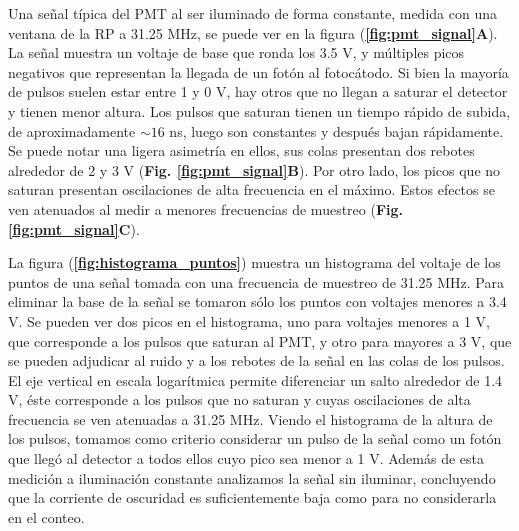 Una señal típica del PMT al ser iluminado de forma constante, medida con una ventana de la RP a 31.25 MHz,  se puede ver en la figura (\textbf{\ref{fig:pmt_signal}A}).
La señal muestra un voltaje de base que ronda los 3.5 V, y múltiples picos negativos que representan la llegada de un fotón al fotocátodo.
Si bien la mayoría de pulsos suelen estar entre 1 y 0 V, hay otros que no llegan a saturar el detector y tienen menor altura.
Los pulsos que saturan tienen un tiempo rápido de subida, de aproximadamente $\sim 16$ ns, luego son constantes y después bajan rápidamente.  
Se puede notar una ligera asimetría en ellos, sus colas presentan dos rebotes alrededor de 2 y 3 V (\textbf{Fig. \ref{fig:pmt_signal}B}).
Por otro lado, los picos que no saturan presentan oscilaciones de alta frecuencia en el máximo.
Estos efectos se ven atenuados al medir a menores frecuencias de muestreo (\textbf{Fig. \ref{fig:pmt_signal}C}). 

La figura (\textbf{\ref{fig:histograma_puntos}}) muestra un histograma del voltaje de los puntos de una señal tomada con una frecuencia de muestreo de 31.25 MHz.
Para eliminar la base de la señal se tomaron sólo los puntos con voltajes menores a 3.4 V.
Se pueden ver dos picos en el histograma, uno para voltajes menores a 1 V, que corresponde a los pulsos que saturan al PMT, y otro para mayores a 3 V, que se pueden adjudicar al ruido y a los rebotes de la señal en las colas de los pulsos.
El eje vertical en escala logarítmica permite diferenciar un salto alrededor de 1.4 V, éste corresponde a los pulsos que no saturan y cuyas oscilaciones de alta frecuencia se ven atenuadas a 31.25 MHz.
Viendo el histograma de la altura de los pulsos, tomamos como criterio considerar un pulso de la señal como un fotón que llegó al detector a todos ellos cuyo pico sea menor a 1 V.
Además de esta medición a iluminación constante analizamos la señal sin iluminar, concluyendo que la corriente de oscuridad es suficientemente baja como para no considerarla en el conteo.


